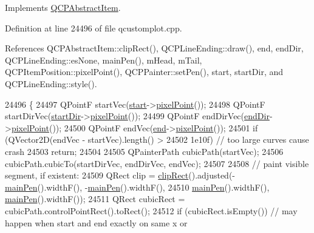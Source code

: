 Implements \hyperlink{class_q_c_p_abstract_item_ad0dc056f650c3ca73414e6b4f01674ef}{Q\+C\+P\+Abstract\+Item}.



Definition at line 24496 of file qcustomplot.\+cpp.



References Q\+C\+P\+Abstract\+Item\+::clip\+Rect(), Q\+C\+P\+Line\+Ending\+::draw(), end, end\+Dir, Q\+C\+P\+Line\+Ending\+::es\+None, main\+Pen(), m\+Head, m\+Tail, Q\+C\+P\+Item\+Position\+::pixel\+Point(), Q\+C\+P\+Painter\+::set\+Pen(), start, start\+Dir, and Q\+C\+P\+Line\+Ending\+::style().


\begin{DoxyCode}
24496                                            \{
24497   QPointF startVec(\hyperlink{class_q_c_p_item_curve_a20c3b5ea31c33764f4f30c2ec7ae518b}{start}->\hyperlink{class_q_c_p_item_position_ae490f9c76ee2ba33752c495d3b6e8fb5}{pixelPoint}());
24498   QPointF startDirVec(\hyperlink{class_q_c_p_item_curve_aa124bf66c09cc51c627fb49db8bf8a7b}{startDir}->\hyperlink{class_q_c_p_item_position_ae490f9c76ee2ba33752c495d3b6e8fb5}{pixelPoint}());
24499   QPointF endDirVec(\hyperlink{class_q_c_p_item_curve_a28181a9dee9cc3c3da83a883221bd2d0}{endDir}->\hyperlink{class_q_c_p_item_position_ae490f9c76ee2ba33752c495d3b6e8fb5}{pixelPoint}());
24500   QPointF endVec(\hyperlink{class_q_c_p_item_curve_a24ecbb195b32a08b42b61c2cf08a1b4d}{end}->\hyperlink{class_q_c_p_item_position_ae490f9c76ee2ba33752c495d3b6e8fb5}{pixelPoint}());
24501   \textcolor{keywordflow}{if} (QVector2D(endVec - startVec).length() >
24502       1e10f) \textcolor{comment}{// too large curves cause crash}
24503     \textcolor{keywordflow}{return};
24504 
24505   QPainterPath cubicPath(startVec);
24506   cubicPath.cubicTo(startDirVec, endDirVec, endVec);
24507 
24508   \textcolor{comment}{// paint visible segment, if existent:}
24509   QRect clip = \hyperlink{class_q_c_p_abstract_item_a538e25ff8856534582f5b2b400a46405}{clipRect}().adjusted(-\hyperlink{class_q_c_p_item_curve_a8089126f5645b6edfbaddea49d1e8390}{mainPen}().widthF(), -\hyperlink{class_q_c_p_item_curve_a8089126f5645b6edfbaddea49d1e8390}{mainPen}().widthF(),
24510                                    \hyperlink{class_q_c_p_item_curve_a8089126f5645b6edfbaddea49d1e8390}{mainPen}().widthF(), \hyperlink{class_q_c_p_item_curve_a8089126f5645b6edfbaddea49d1e8390}{mainPen}().widthF());
24511   QRect cubicRect = cubicPath.controlPointRect().toRect();
24512   \textcolor{keywordflow}{if} (cubicRect.isEmpty()) \textcolor{comment}{// may happen when start and end exactly on same x or}

\end{DoxyCode}

